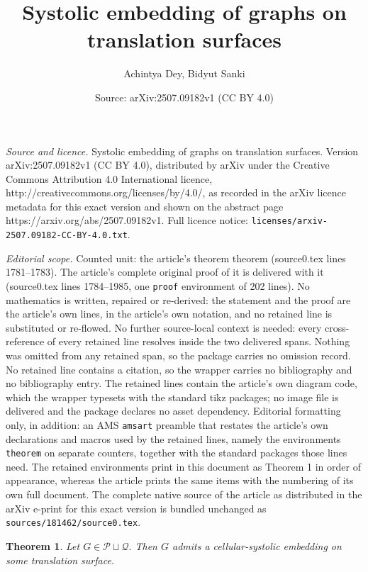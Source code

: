 \documentclass[10pt,a4paper]{amsart}
\title{Systolic embedding of graphs on translation surfaces}
\author{Achintya Dey, Bidyut Sanki}
\date{Source: arXiv:2507.09182v1 (CC BY 4.0)}
\newtheorem{theorem}{Theorem}
\begin{document}
\maketitle

\noindent\emph{Source and licence.} Systolic embedding of graphs on translation surfaces. Version arXiv:2507.09182v1 (CC BY 4.0), distributed by arXiv under the Creative Commons Attribution 4.0 International licence, http://creativecommons.org/licenses/by/4.0/, as recorded in the arXiv licence metadata for this exact version and shown on the abstract page https://arxiv.org/abs/2507.09182v1. Full licence notice: \texttt{licenses/arxiv-2507.09182-CC-BY-4.0.txt}.\par\smallskip

\noindent\textit{Editorial scope.} Counted unit: the article's theorem theorem (source0.tex lines 1781--1783). The article's complete original proof of it is delivered with it (source0.tex lines 1784--1985, one \texttt{proof} environment of 202 lines). No mathematics is written, repaired or re-derived: the statement and the proof are the article's own lines, in the article's own notation, and no retained line is substituted or re-flowed.  No further source-local context is needed: every cross-reference of every retained line resolves inside the two delivered spans.  Nothing was omitted from any retained span, so the package carries no omission record.  No retained line contains a citation, so the wrapper carries no bibliography and no bibliography entry.  The retained lines contain the article's own diagram code, which the wrapper typesets with the standard tikz packages; no image file is delivered and the package declares no asset dependency.  Editorial formatting only, in addition: an AMS \texttt{amsart} preamble that restates the article's own declarations and macros used by the retained lines, namely the environments \texttt{theorem} on separate counters, together with the standard packages those lines need.  The retained environments print in this document as Theorem 1 in order of appearance, whereas the article prints the same items with the numbering of its own full document.  The complete native source of the article as distributed in the arXiv e-print for this exact version is bundled unchanged as \texttt{sources/181462/source0.tex}.
\begin{theorem}
Let $G\in \mathcal{P} \sqcup \mathcal{Q}.$ Then $G$ admits a cellular-systolic embedding on some translation surface.   
\end{theorem}
\end{document}

